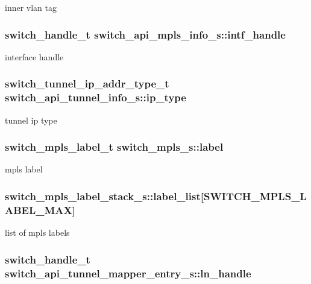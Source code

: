 inner vlan tag \hypertarget{group__Tunnel_ga8d7c143424c5cb897e18e749ef9aaff7}{
\subsubsection[{intf\+\_\+handle}]{\setlength{\rightskip}{0pt plus 5cm}switch\+\_\+handle\+\_\+t switch\+\_\+api\+\_\+mpls\+\_\+info\+\_\+s\+::intf\+\_\+handle}}\label{group__Tunnel_ga8d7c143424c5cb897e18e749ef9aaff7}
interface handle \hypertarget{group__Tunnel_ga216a84a9b59dfb89fcc2233add2d2dfb}{
\subsubsection[{ip\+\_\+type}]{\setlength{\rightskip}{0pt plus 5cm}switch\+\_\+tunnel\+\_\+ip\+\_\+addr\+\_\+type\+\_\+t switch\+\_\+api\+\_\+tunnel\+\_\+info\+\_\+s\+::ip\+\_\+type}}\label{group__Tunnel_ga216a84a9b59dfb89fcc2233add2d2dfb}
tunnel ip type \hypertarget{group__Tunnel_ga2c144b7c6e8e43b29bf0fe4cc2075204}{
\subsubsection[{label}]{\setlength{\rightskip}{0pt plus 5cm}switch\+\_\+mpls\+\_\+label\+\_\+t switch\+\_\+mpls\+\_\+s\+::label}}\label{group__Tunnel_ga2c144b7c6e8e43b29bf0fe4cc2075204}
mpls label \hypertarget{group__Tunnel_gaf21845a304f409165053ed260fc8da3e}{
\subsubsection[{label\+\_\+list}]{ switch\+\_\+mpls\+\_\+label\+\_\+stack\+\_\+s\+::label\+\_\+list\mbox{[}{\bf S\+W\+I\+T\+C\+H\+\_\+\+M\+P\+L\+S\+\_\+\+L\+A\+B\+E\+L\+\_\+\+M\+A\+X}\mbox{]}}}\label{group__Tunnel_gaf21845a304f409165053ed260fc8da3e}
list of mpls labels \hypertarget{group__Tunnel_gafbb8e8e313ad0a67bc337a6a29878a7c}{
\subsubsection[{ln\+\_\+handle}]{\setlength{\rightskip}{0pt plus 5cm}switch\+\_\+handle\+\_\+t switch\+\_\+api\+\_\+tunnel\+\_\+mapper\+\_\+entry\+\_\+s\+::ln\+\_\+handle}}\label{group__Tunnel_gafbb8e8e313ad0a67bc337a6a29878a7c}
